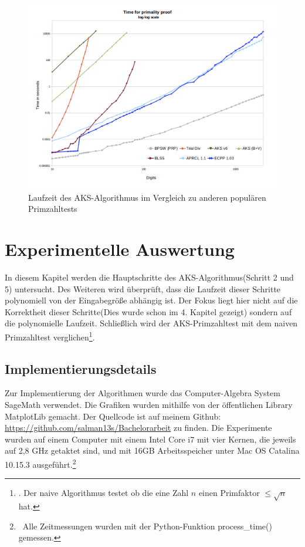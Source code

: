 \documentclass[12pt,oneside]{article}
\theoremstyle{remark}
\theoremstyle{definition}
\begin{document}
\begin{figure}[h]
\includegraphics[width=13cm]{plots/Screenshot 2020-04-23 at 02.12.06.png}
\centering
\caption{\small{Laufzeit des AKS-Algorithmus im Vergleich zu anderen populären Primzahltests}}
\end{figure}

\newpage

\section{Experimentelle Auswertung}
In diesem Kapitel werden die Hauptschritte des AKS-Algorithmus(Schritt 2 und 5) untersucht. Des Weiteren wird überprüft, dass die Laufzeit dieser Schritte polynomiell von der Eingabegröße abhängig ist. Der Fokus liegt hier nicht auf die Korrektheit dieser Schritte(Dies wurde schon im 4. Kapitel gezeigt) sondern auf die polynomielle Laufzeit. Schließlich wird der AKS-Primzahltest mit dem naiven Primzahltest verglichen\footnote{. Der naive Algorithmus testet ob die eine Zahl $n$ einen Primfaktor $\leq  \sqrt{n}$ hat.}. 



\subsection{Implementierungsdetails}
Zur Implementierung der Algorithmen wurde das Computer-Algebra System SageMath verwendet. Die Grafiken wurden mithilfe von der öffentlichen Library MatplotLib gemacht. Der Quellcode ist auf meinem Github: \url{https://github.com/salman13s/Bachelorarbeit} zu finden. Die Experimente wurden auf einem Computer mit einem Intel Core i7 mit vier Kernen, die jeweils auf 2,8 GHz getaktet sind, und mit 16GB Arbeitsspeicher unter Mac OS Catalina 10.15.3 ausgeführt.\footnote{$\,$ Alle Zeitmessungen wurden mit der Python-Funktion process\_time() gemessen.}
\end{document}
